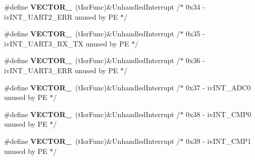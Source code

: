 \begin{DoxyCompactItemize}
\item 
\#define {\bfseries V\+E\+C\+T\+O\+R\+\_}~(t\+Isr\+Func)\&Unhandled\+Interrupt         /$\ast$ 0x34 -\/    iv\+I\+N\+T\+\_\+\+U\+A\+R\+T2\+\_\+\+E\+R\+R                unused by P\+E $\ast$/\hypertarget{group___vectors___config__module_gac2db7afced828f466a43d0861c7d3878}{}\label{group___vectors___config__module_gac2db7afced828f466a43d0861c7d3878}

\item 
\#define {\bfseries V\+E\+C\+T\+O\+R\+\_}~(t\+Isr\+Func)\&Unhandled\+Interrupt         /$\ast$ 0x35 -\/    iv\+I\+N\+T\+\_\+\+U\+A\+R\+T3\+\_\+\+R\+X\+\_\+\+T\+X              unused by P\+E $\ast$/\hypertarget{group___vectors___config__module_ga12c5a6d85b16b6b0a635278195e453a5}{}\label{group___vectors___config__module_ga12c5a6d85b16b6b0a635278195e453a5}

\item 
\#define {\bfseries V\+E\+C\+T\+O\+R\+\_}~(t\+Isr\+Func)\&Unhandled\+Interrupt         /$\ast$ 0x36 -\/    iv\+I\+N\+T\+\_\+\+U\+A\+R\+T3\+\_\+\+E\+R\+R                unused by P\+E $\ast$/\hypertarget{group___vectors___config__module_gadc720fab1fc87e7e330a545c81b1fd79}{}\label{group___vectors___config__module_gadc720fab1fc87e7e330a545c81b1fd79}

\item 
\#define {\bfseries V\+E\+C\+T\+O\+R\+\_}~(t\+Isr\+Func)\&Unhandled\+Interrupt         /$\ast$ 0x37 -\/    iv\+I\+N\+T\+\_\+\+A\+D\+C0                     unused by P\+E $\ast$/\hypertarget{group___vectors___config__module_gafd22db38d216e722f765ed3926f30788}{}\label{group___vectors___config__module_gafd22db38d216e722f765ed3926f30788}

\item 
\#define {\bfseries V\+E\+C\+T\+O\+R\+\_}~(t\+Isr\+Func)\&Unhandled\+Interrupt         /$\ast$ 0x38 -\/    iv\+I\+N\+T\+\_\+\+C\+M\+P0                     unused by P\+E $\ast$/\hypertarget{group___vectors___config__module_ga5d1266192e31481c65c49109ad9567ca}{}\label{group___vectors___config__module_ga5d1266192e31481c65c49109ad9567ca}

\item 
\#define {\bfseries V\+E\+C\+T\+O\+R\+\_}~(t\+Isr\+Func)\&Unhandled\+Interrupt         /$\ast$ 0x39 -\/    iv\+I\+N\+T\+\_\+\+C\+M\+P1                     unused by P\+E $\ast$/\hypertarget{group___vectors___config__module_gae5abe627f4c588dfb2097164c7be0e23}{}\label{group___vectors___config__module_gae5abe627f4c588dfb2097164c7be0e23}


\end{DoxyCompactItemize}

